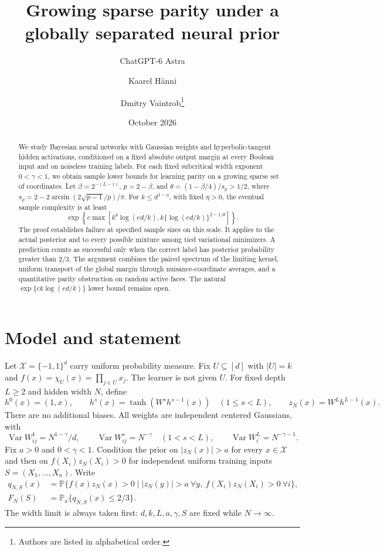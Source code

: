 \documentclass[11pt]{article}
\title{Growing sparse parity under a globally separated neural prior}
\author{ChatGPT-6 Astra \and Kaarel H\"anni \and Dmitry Vaintrob\thanks{Authors are listed in alphabetical order.}}
\date{October 2026}
\theoremstyle{remark}\newtheorem{remark}[theorem]{Remark}
\DeclareMathOperator{\Var}{Var}
\newcommand{\Pp}{\mathbb P}
\begin{document}
\maketitle
\begin{abstract}
We study Bayesian neural networks with Gaussian weights and
hyperbolic-tangent hidden activations, conditioned on a fixed absolute
output margin at every Boolean input and on noiseless training labels.
For each fixed subcritical width exponent $0<\gamma<1$, we obtain
sample lower bounds for learning parity on a growing sparse set of
coordinates. Let $\beta=2^{-(L-1)}$, $p=2-\beta$, and
$\theta=(1-\beta/4)/s_p>1/2$, where
$s_p=2-2\arcsin(2\sqrt{p-1}/p)/\pi$.
For $k\le d^{1-\eta}$, with fixed $\eta>0$, the eventual sample
complexity is at least
\[
 \exp\!\left\{c\max\left[k^\theta\log(ed/k),
                  k\{\log(ed/k)\}^{2-1/\theta}\right]\right\}.
\]
The proof establishes failure at specified sample sizes on this scale.
It applies to the actual posterior and to every possible mixture among
tied variational minimizers. A prediction counts as successful only
when the correct label has posterior probability greater than $2/3$.
The argument combines the paired spectrum of the limiting kernel,
uniform transport of the global margin through nuisance-coordinate
averages, and a quantitative parity obstruction on random active
faces. The natural $\exp\{c k\log(ed/k)\}$ lower bound remains open.
\end{abstract}

\section{Model and statement}
Let $\mathcal X=\{-1,1\}^d$ carry uniform probability measure.
Fix $U\subseteq[d]$ with $|U|=k$ and
$f(x)=\chi_U(x)=\prod_{j\in U}x_j$.
The learner is not given $U$. For fixed depth $L\ge2$ and hidden width
$N$, define
\[
 h^0(x)=(1,x),\qquad
 h^s(x)=\tanh(W^s h^{s-1}(x))\quad(1\le s<L),\qquad
 z_N(x)=W^L h^{L-1}(x).
\]
There are no additional biases. All weights are independent centered
Gaussians, with
\begin{equation}\label{eq:weights}
 \Var W^1_{ij}=N^{1-\gamma}/d,\qquad
 \Var W^s_{ij}=N^{-\gamma}\quad(1<s<L),\qquad
 \Var W^L_i=N^{-\gamma-1}.
\end{equation}
Fix $a>0$ and $0<\gamma<1$. Condition the prior on
$|z_N(x)|>a$ for every $x\in\mathcal X$ and then on
$f(X_i)z_N(X_i)>0$ for independent uniform training inputs
$S=(X_1,\ldots,X_n)$. Write
\begin{align*}
 q_{N,S}(x)&=\Pp\{f(x)z_N(x)>0\mid
        |z_N(y)|>a\ \forall y,\ f(X_i)z_N(X_i)>0\ \forall i\},\\
 F_N(S)&=\Pp_x\{q_{N,S}(x)\le2/3\}.
\end{align*}
The width limit is always taken first: $d,k,L,a,\gamma,S$ are fixed
while $N\to\infty$.
\end{document}
